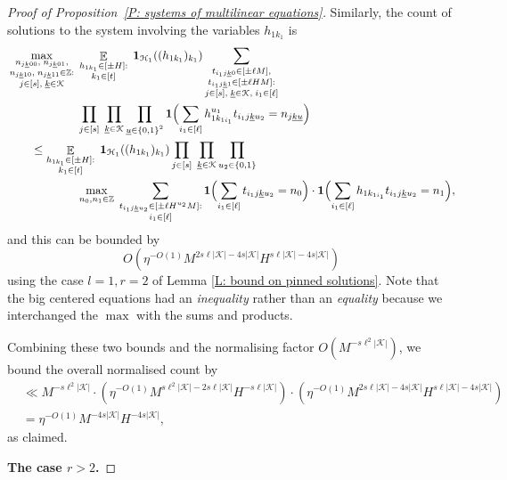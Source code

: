 \documentclass[11pt]{amsart}
\theoremstyle{definition}
\DeclareMathOperator*{\E}{\mathbb{E}}
\newcommand{\Z}{{\mathbb Z}}
\newcommand{\CH}{{\mathcal H}}
\newcommand{\CK}{{\mathcal K}}
\newcommand{\uk}{{\underline{k}}}
\newcommand{\uu}{{\underline{u}}}
\newcommand{\brac}[1]{\mathopen{}\left( #1 \mathclose{}\right)}
\newcommand{\Bigbrac}[1]{\Bigl( #1 \Bigr)}
\begin{document}
\begin{proof}[Proof of Proposition~\ref{P: systems of multilinear equations}]
    Similarly, the count of solutions to the system involving the variables $h_{1k_1}$ is
\begin{align*}
        &\max_{\substack{n_{j\uk00},\; n_{j\uk01},\\ n_{j\uk10},\; n_{j\uk11}\in\Z:\\ j\in[s],\; \uk\in\CK}}\;
        \E_{\substack{h_{1k_1}\in[\pm H]:\\  k_1\in[t]}}\; \mathbf{1}_{\CH_1}((h_{1k_1})_{k_1}) \sum_{\substack{t_{i_1 j\uk 0}\in[\pm\ell M],\\ t_{i_1 j\uk 1}\in[\pm\ell H M]:\\ j\in[s],\; \uk\in\CK,\; i_1\in[\ell]}}\\
        &\qquad\qquad\qquad\prod_{j\in[s]}\; \prod_{\substack{\uk\in\CK}}\prod_{\substack{\uu\in\{0,1\}^2}} \mathbf{1}\Bigbrac{\sum\limits_{i_1\in[\ell]} h_{1k_{1i_1}}^{u_1} t_{i_1 j\uk u_2} = n_{j\uk\uu}}\\
        &\qquad\leq  \E_{\substack{h_{1k_1}\in[\pm H]:\\  k_1\in[t]}}\; \mathbf{1}_{\CH_1}((h_{1k_1})_{k_1}) \prod_{j\in[s]}\; \prod_{\substack{\uk\in\CK}}\prod_{\substack{u_2\in\{0,1\}}}\\
        &\qquad\qquad\qquad\max_{n_0, n_1\in\Z}\; \sum_{\substack{t_{i_1 j\uk u_2}\in[\pm\ell H^{u_2} M]:\\  i_1\in[\ell]}}\mathbf{1}\Bigbrac{\sum\limits_{i_1\in[\ell]} t_{i_1 j\uk u_2} = n_0}\cdot \mathbf{1}\Bigbrac{\sum\limits_{i_1\in[\ell]} h_{1k_{1i_1}} t_{i_1 j\uk u_2} = n_1},
\end{align*}
and this can be bounded by
$$O(\eta^{-O(1)} M^{2 s\ell |\CK|-4s|\CK|} H^{s\ell|\CK|-4s|\CK|})$$
using the case $l=1, r=2$ of Lemma \ref{L: bound on pinned solutions}. Note that the big centered equations had an  \emph{inequality} rather than an \emph{equality} because we interchanged the $\max$ with the sums and products.

    Combining these two bounds and the normalising factor $O(M^{-s \ell^2|\CK|})$, we bound the overall normalised count by
    \begin{align*}
        &\ll M^{-s \ell^2|\CK|}\cdot \brac{\eta^{-O(1)} M^{s\ell^2|\CK|-2s\ell|\CK|} H^{-s\ell|\CK|}}\cdot \brac{\eta^{-O(1)} M^{2 s\ell|\CK|-4s|\CK|} H^{s\ell|\CK|-4s|\CK|}}\\
        &= \eta^{-O(1)} M^{-4s|\CK|}H^{-4s|\CK|},
    \end{align*}
    as claimed.

\smallskip
\textbf{The case $r>2$.}
\smallskip


\end{proof}
\end{document}
